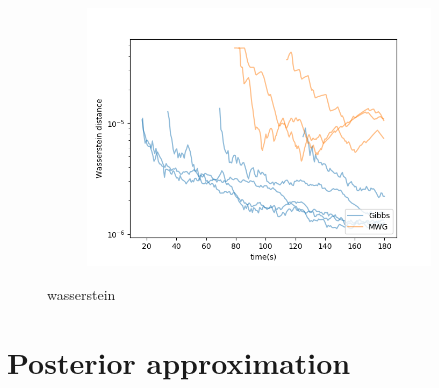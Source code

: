 \begin{figure}[h]
\begin{subfigure}{0.3\linewidth}
    	\includegraphics[width=\linewidth]{../../plots/KL_M4_N60_NMCMC3_seed0_diffind2.png}
	\end{subfigure}
	\caption{wasserstein}
\end{figure}

\section{Posterior approximation}

